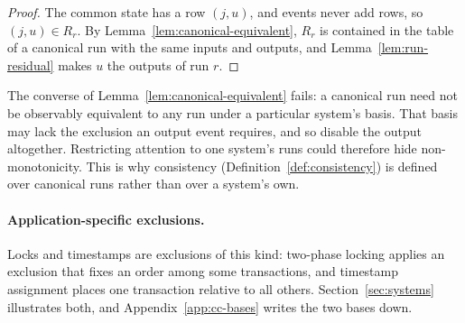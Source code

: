 \begin{proof}
The common state has a row $(j,u)$, and events never add rows, so
$(j,u)\in R_r$.  By Lemma~\ref{lem:canonical-equivalent}, $R_r$ is contained in
the table of a canonical run with the same inputs and outputs, and
Lemma~\ref{lem:run-residual} makes $u$ \outrel the outputs of run $r$.
\end{proof}

The converse of Lemma~\ref{lem:canonical-equivalent} fails: a canonical run
need not be observably equivalent to any run under a particular system's
basis.  That basis may lack the exclusion an
output event requires, and so disable the output altogether.  Restricting
attention to one system's runs could therefore hide non-monotonicity.  This is
why consistency (Definition~\ref{def:consistency}) is defined over canonical
runs rather than over a system's own.

\paragraph{Application-specific exclusions.}
Locks and timestamps are exclusions of this kind: two-phase locking applies an exclusion that fixes an order among some transactions, and timestamp assignment places one transaction
relative to all others.  Section~\ref{sec:systems} illustrates both, and
Appendix~\ref{app:cc-bases} writes the two bases down.
